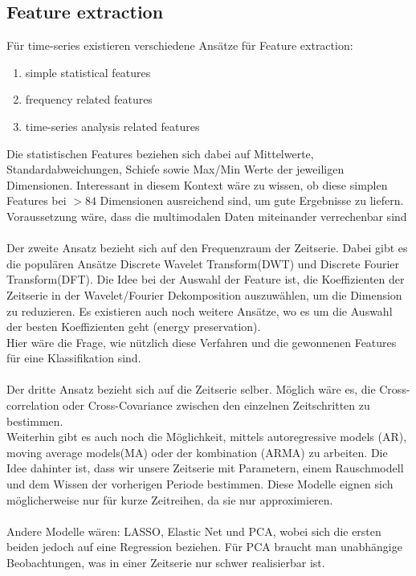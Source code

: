 \documentclass[]{report}
\begin{document}
\subsection*{Feature extraction}
Für time-series existieren verschiedene Ansätze für Feature extraction:
\begin{enumerate}
\item simple statistical features
\item frequency related features
\item time-series analysis related features
\end{enumerate}
Die statistischen Features beziehen sich dabei auf Mittelwerte, Standardabweichungen, Schiefe sowie Max/Min Werte der jeweiligen Dimensionen. Interessant in diesem Kontext wäre zu wissen, ob diese simplen Features bei $>84$ Dimensionen ausreichend sind, um gute Ergebnisse zu liefern. Voraussetzung wäre, dass die multimodalen Daten miteinander verrechenbar sind \\ \\
Der zweite Ansatz bezieht sich auf den Frequenzraum der Zeitserie. Dabei gibt es die populären Ansätze Discrete Wavelet Transform(DWT) und Discrete Fourier Transform(DFT). Die Idee bei der Auswahl der Feature ist, die Koeffizienten der Zeitserie in der Wavelet/Fourier Dekomposition auszuwählen, um die Dimension zu reduzieren. Es existieren auch noch weitere Ansätze, wo es um die Auswahl der besten Koeffizienten geht (energy preservation). \\
Hier wäre die Frage, wie nützlich diese Verfahren und die gewonnenen Features für eine Klassifikation sind.\\\\
Der dritte Ansatz bezieht sich auf die Zeitserie selber. Möglich wäre es, die Cross-correlation oder Cross-Covariance zwischen den einzelnen Zeitschritten zu bestimmen.\\
Weiterhin gibt es auch noch die Möglichkeit, mittels autoregressive models (AR), moving average models(MA) oder der kombination (ARMA) zu arbeiten. Die Idee dahinter ist, dass wir unsere Zeitserie mit Parametern, einem Rauschmodell und dem Wissen der vorherigen Periode bestimmen. Diese Modelle eignen sich möglicherweise nur für kurze Zeitreihen, da sie nur approximieren.\\\\
Andere Modelle wären: LASSO, Elastic Net und PCA, wobei sich die ersten beiden jedoch auf eine Regression beziehen.
Für PCA braucht man unabhängige Beobachtungen, was in einer Zeitserie nur schwer realisierbar ist.
\end{document}
